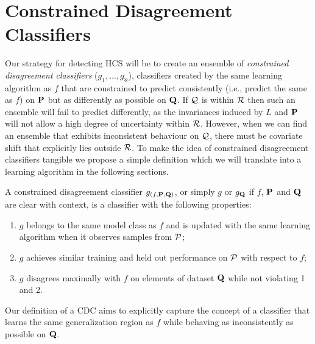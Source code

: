 \section{Constrained Disagreement Classifiers}\label{sec:constrained-disagreement-classifier-(cdc)}
Our strategy for detecting HCS will be to create an ensemble of \textit{constrained disagreement classifiers} ($g_1, \ldots, g_\aleph $),
classifiers created by the same learning algorithm as $f$ that are constrained to predict consistently (i.e., predict the same as $f$) on $\mathbf{P}$ but as differently as possible on $\mathbf{Q}$.
If $\mathcal{Q}$ is within $\mathcal{R}$ then such an ensemble will fail to predict differently, as the invariances induced by $L$ and $\mathbf{P}$ will not allow a high degree of uncertainty within $\mathcal{R}$.
However, when we can find an ensemble that exhibits inconsistent behaviour on $\mathcal{Q}$, there must be covariate shift that explicitly lies outside $\mathcal{R}$.
To make the idea of constrained disagreement classifiers tangible we propose a simple definition which we will translate into a learning algorithm in the following sections.

\begin{definition}
    A constrained disagreement classifier $g_{(f, \mathbf{P}, \mathbf{Q})}$, or simply $g$ or $g_{\mathbf{Q}}$ if $f$, $\mathbf{P}$ and $\mathbf{Q}$ are clear with context, is a classifier with the following properties:
    \begin{enumerate}
        \item $g$ belongs to the same model class as $f$ and is updated with the same learning algorithm when it observes samples from $\mathcal{P}$;
        \item $g$ achieves similar training and held out performance on $\mathcal{P}$ with respect to $f$;
        \item $g$ disagrees maximally with $f$ on elements of dataset $\mathbf{Q}$ while not violating 1 and 2.
    \end{enumerate}
    Our definition of a CDC aims to explicitly capture the concept of a classifier that learns the same generalization region as $f$ while behaving as inconsistently as possible on $\mathbf{Q}$.
\end{definition}


